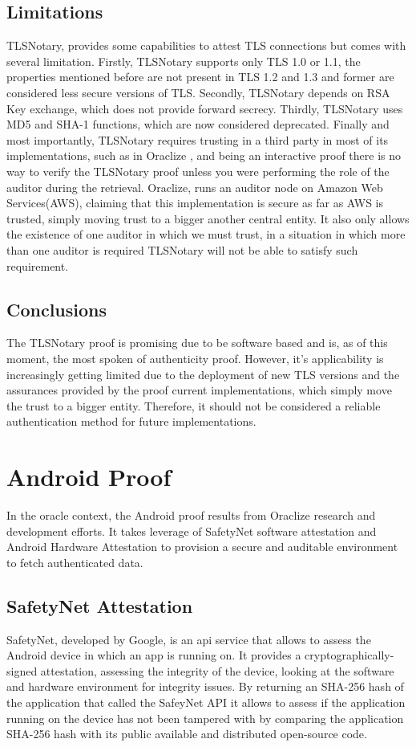 \subsection{Limitations}
TLSNotary, provides some capabilities to attest TLS connections but comes with several limitation. Firstly, TLSNotary supports only TLS 1.0 or 1.1, the properties mentioned before are not present in TLS 1.2 and 1.3 and former are considered less secure versions of TLS. Secondly, TLSNotary depends on RSA Key exchange, which does not provide forward secrecy. Thirdly, TLSNotary uses MD5 and SHA-1 functions, which are now considered deprecated. Finally and most importantly, TLSNotary requires trusting in a third party in most of its implementations, such as in Oraclize \cite{Oraclize.it2018OraclizeDocumentation}, and being an interactive proof there is no way to verify the TLSNotary proof unless you were performing the role of the auditor during the retrieval. Oraclize, runs an auditor node on Amazon Web Services(AWS), claiming that this implementation is secure as far as AWS is trusted, simply moving trust to a bigger another central entity. It also only allows the existence of one auditor in which we must trust, in a situation in which more than one auditor is required TLSNotary will not be able to satisfy such requirement.


\subsection{Conclusions}
The TLSNotary proof is promising due to be software based and is, as of this moment, the most spoken of authenticity proof. However, it's applicability is increasingly getting limited due to the deployment of new TLS versions and the assurances provided by the proof current implementations, which simply move the trust to a bigger entity. Therefore, it should not be considered a reliable authentication method for future implementations.

\section{Android Proof}
In the oracle context, the Android proof results from Oraclize research and development efforts. It takes leverage of SafetyNet software attestation and Android Hardware Attestation to provision a secure and auditable environment to fetch authenticated data. 

\subsection{SafetyNet Attestation}
SafetyNet, developed by Google, is an api service that allows to assess the Android device in which an app is running on. It provides a cryptographically-signed attestation, assessing the integrity of the device, looking at the software and hardware environment for integrity issues. By returning an SHA-256 hash of the application that called the SafeyNet API it allows to assess if the application running on the device has not been tampered with by comparing the application SHA-256 hash with its public available and distributed open-source code.

